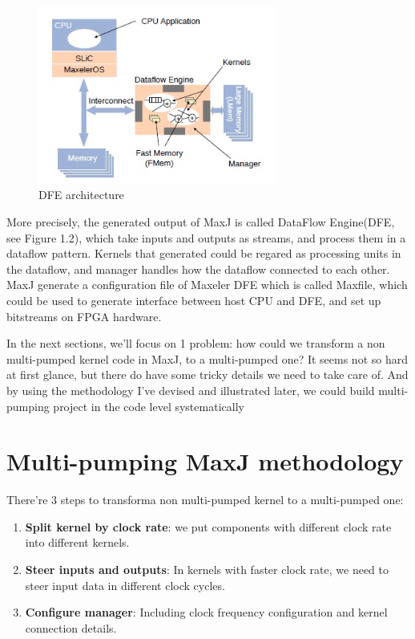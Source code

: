 \documentclass[a4paper, 10pt]{report}
\begin{document}
\begin{figure}[h!]
  \caption{DFE architecture}
  \centering
    \includegraphics[width=0.7\textwidth]{dfe-arch}
\end{figure}

More precisely, the generated output of MaxJ is called DataFlow Engine(DFE, see Figure 1.2), which take inputs and outputs as streams, and process them in a dataflow pattern. Kernels that generated could be regared as processing units in the dataflow, and manager handles how the dataflow connected to each other. MaxJ generate a configuration file of Maxeler DFE which is called Maxfile, which could be used to generate interface between host CPU and DFE, and set up bitstreams on FPGA hardware.

In the next sections, we'll focus on 1 problem: how could we transform a non multi-pumped kernel code in MaxJ, to a multi-pumped one? It seems not so hard at first glance, but there do have some tricky details we need to take care of. And by using the methodology I've devised and illustrated later, we could build multi-pumping project in the code level systematically

\section{Multi-pumping MaxJ methodology}
There're 3 steps to transforma non multi-pumped kernel to a multi-pumped one:
\begin{enumerate}
\item \textbf{Split kernel by clock rate}: we put components with different clock rate into different kernels.
\item \textbf{Steer inputs and outputs}: In kernels with faster clock rate, we need to steer input data in different clock cycles.
\item \textbf{Configure manager}: Including clock frequency configuration and kernel connection details.
\end{enumerate}
\end{document}
